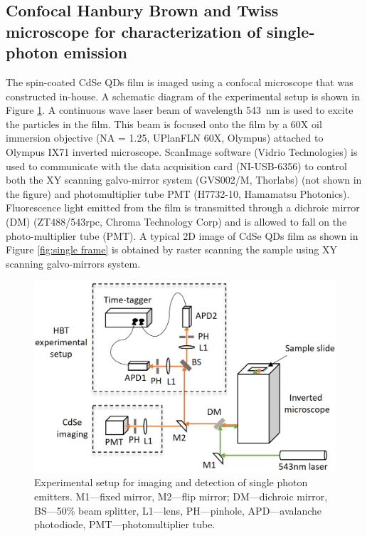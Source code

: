 \documentclass[%
 aip,
 amsmath,amssymb,
 reprint,%
]{revtex4-1}
\begin{document}
\subsection{\textbf{Confocal  Hanbury Brown and Twiss  microscope for characterization of single-photon emission}}
The spin-coated CdSe QDs film is imaged using a confocal microscope  that was constructed in-house\cite{HH}. A schematic diagram of the experimental setup is shown in Figure \ref{fig:experimental setup}. A continuous wave laser beam of wavelength 543~nm is used to excite the particles in the film. This beam is focused onto the film by a 60X oil immersion objective (NA = 1.25, UPlanFLN 60X, Olympus) attached to Olympus IX71 inverted microscope. ScanImage software (Vidrio Technologies) is used to communicate with the data acquisition card (NI-USB-6356) to control both the XY scanning galvo-mirror system (GVS002/M, Thorlabs) (not shown in the figure) and photomultiplier tube PMT (H7732-10, Hamamatsu Photonics). Fluorescence light emitted from the film is transmitted through a dichroic mirror (DM) (ZT488/543rpc, Chroma Technology Corp) and is allowed to fall on the photo-multiplier tube (PMT). A typical 2D image of CdSe QDs film as shown in Figure \ref{fig:single frame} is obtained by raster scanning  the sample using XY scanning galvo-mirrors system.

\begin{figure}
    \centering
    \includegraphics[width=1\linewidth]{experimental setup.png}
    \caption{Experimental setup for imaging and detection of single photon emitters. M1---fixed mirror,  M2---flip mirror; DM---dichroic mirror, BS---50\% beam splitter, L1---lens, PH---pinhole, APD---avalanche photodiode, PMT---photomultiplier tube.}
    \label{fig:experimental setup}
\end{figure}
\end{document}
